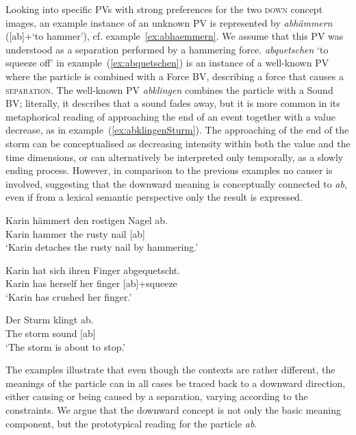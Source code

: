 \documentclass[output=paper]{langsci/langscibook}
\begin{document}
Looking into specific PVs with strong preferences for the two
\textsc{down} concept images, an example instance of an unknown PV is represented
by \textit{abhämmern} ([ab]+`to hammer'),
cf. example~\ref{ex:abhaemmern}. We assume that this PV was understood
as a separation performed by a hammering force. \textit{abquetschen}
`to squeeze off' in example~(\ref{ex:abquetschen}) is an instance of
a well-known PV where the particle is combined with a Force
BV, describing a force that causes a \textsc{separation}. The
well-known PV \textit{abklingen} combines the particle with a
Sound BV; literally, it describes that a sound fades away,
but it is more common in its metaphorical reading of approaching the
end of an event together with a value decrease, as in
example~(\ref{ex:abklingenSturm}). The approaching of the end of the
storm can be conceptualised as decreasing intensity within both the
value and the time dimensions, or can alternatively be interpreted
only temporally, as a slowly ending process. However, in comparison to
the previous examples no causer is involved, suggesting that the
downward meaning is conceptually connected to \textit{ab}, even if
from a lexical semantic perspective only the result is expressed.

\ea\label{ex:abhaemmern}
\gll Karin hämmert den rostigen Nagel ab.\\
Karin hammer the rusty nail [ab]\\
\glt `Karin detaches the rusty nail by hammering.'
\z


\ea\label{ex:abquetschen}
\gll Karin hat sich ihren Finger abgequetscht.\\
Karin has herself her finger [ab]+squeeze\\
\glt `Karin has crushed her finger.'
\z

\ea \label{ex:abklingenSturm}
\gll Der Sturm klingt ab.\\
The storm sound [ab]\\
\glt `The storm is about to stop.'
\z

The examples illustrate that even though the contexts are rather
different, the meanings of the particle can in all cases be traced
back to a downward direction, either causing or being caused by a
separation, varying according to the constraints. We argue that the
downward concept is not only the basic meaning component, but the
prototypical reading for the particle \textit{ab}.
\end{document}

